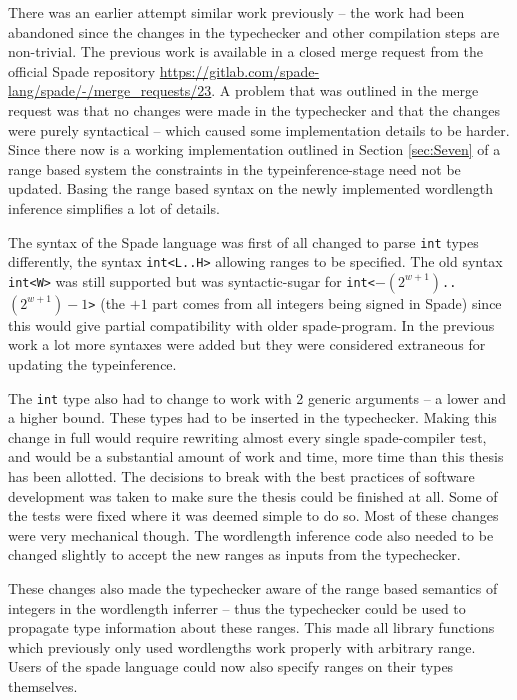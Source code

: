 \documentclass[msc,lith,english]{liuthesis}
\begin{document}
There was an earlier attempt similar work previously -- the work had been abandoned since the changes in the typechecker and other compilation steps are non-trivial. The previous work is available in a closed merge request from the official Spade repository \url{https://gitlab.com/spade-lang/spade/-/merge_requests/23}. A problem that was outlined in the merge request was that no changes were made in the typechecker and that the changes were purely syntactical -- which caused some implementation details to be harder. Since there now is a working implementation outlined in Section \ref{sec:Seven} of a range based system the constraints in the typeinference-stage need not be updated. Basing the range based syntax on the newly implemented wordlength inference simplifies a lot of details.

The syntax of the Spade language was first of all changed to parse \verb+int+ types differently, the syntax \verb+int<L..H>+ allowing ranges to be specified. The old syntax \verb+int<W>+ was still supported but was syntactic-sugar for \verb!int<!$-(2^{w+1})$\verb!..!$(2^{w+1})-1$\verb!>! (the $+1$ part comes from all integers being signed in Spade) since this would give partial compatibility with older spade-program. In the previous work a lot more syntaxes were added but they were considered extraneous for updating the typeinference.

The \verb+int+ type also had to change to work with 2 generic arguments -- a lower and a higher bound. These types had to be inserted in the typechecker. Making this change in full would require rewriting almost every single spade-compiler test, and would be a substantial amount of work and time, more time than this thesis has been allotted. The decisions to break with the best practices of software development was taken to make sure the thesis could be finished at all. Some of the tests were fixed where it was deemed simple to do so. Most of these changes were very mechanical though. The wordlength inference code also needed to be changed slightly to accept the new ranges as inputs from the typechecker.

These changes also made the typechecker aware of the range based semantics of integers in the wordlength inferrer -- thus the typechecker could be used to propagate type information about these ranges. This made all library functions which previously only used wordlengths work properly with arbitrary range. Users of the spade language could now also specify ranges on their types themselves.
\end{document}
